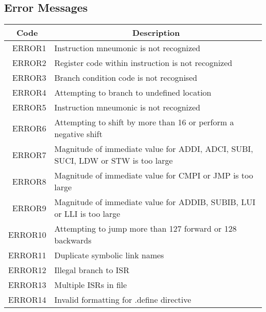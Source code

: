 \subsection{Error Messages}
\begin{center}
	\centering
	\begin{tabular}{r|p{12cm}}
		\multicolumn{1}{c}{\bf Code} & \multicolumn{1}{c}{\bf Description} \\
		\hline\hline
		ERROR1& Instruction mneumonic is not recognized \\
		ERROR2& Register code within instruction is not recognized\\
		ERROR3& Branch condition code is not recognised\\
		ERROR4& Attempting to branch to undefined location \\
		ERROR5& Instruction mneumonic is not recognized \\
		ERROR6& Attempting to shift by more than 16 or perform a negative shift \\
		ERROR7& Magnitude of immediate value for ADDI, ADCI, SUBI, SUCI, LDW or STW is too large\\
		ERROR8& Magnitude of immediate value for CMPI or JMP is too large \\
		ERROR9& Magnitude of immediate value for ADDIB, SUBIB, LUI or LLI is too large \\
		ERROR10& Attempting to jump more than 127 forward or 128 backwards \\
		ERROR11& Duplicate symbolic link names \\
		ERROR12& Illegal branch to ISR \\
		ERROR13& Multiple ISRs in file \\
		ERROR14& Invalid formatting for .define directive \\
	\end{tabular}
\end{center}
